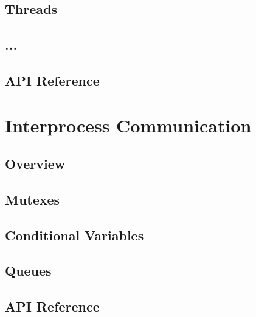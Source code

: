 \subsection{Threads}
\subsection{...}
\subsection{API Reference}

\section{Interprocess Communication}
\subsection{Overview}
\subsection{Mutexes}
\subsection{Conditional Variables}
\subsection{Queues}
\subsection{API Reference}
